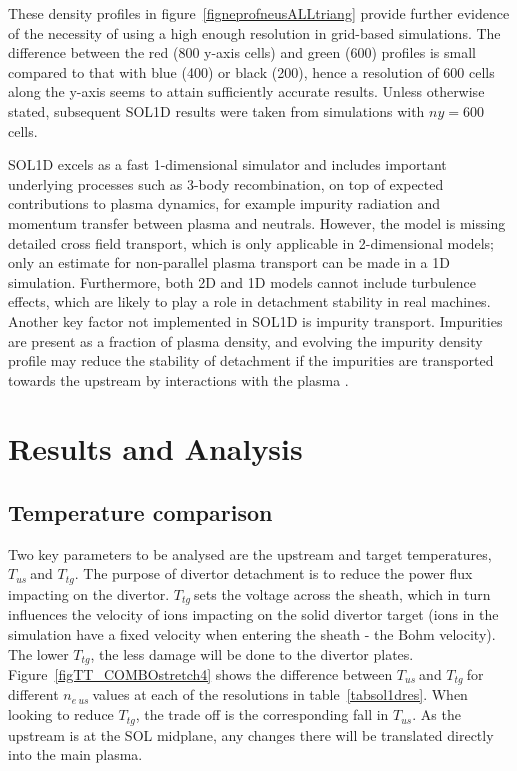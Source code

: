 \documentclass[12pt]{article}  %
\providecommand{\neus}{$n_{e~us}~$} %
\providecommand{\Tus}{$T_{us}~$} %
\providecommand{\Ttg}{$T_{tg}~$} %
\providecommand{\tus}{$T_{us}$} %
\providecommand{\ttg}{$T_{tg}$} %
\begin{document}
These density profiles in figure~\ref{figneprofneusALLtriang} provide further evidence of the necessity of using a high enough resolution in grid-based simulations. The difference between the red (800 y-axis cells) and green (600) profiles is small compared to that with blue (400) or black (200), hence a resolution of 600 cells along the y-axis seems to attain sufficiently accurate results. Unless otherwise stated, subsequent SOL1D results were taken from simulations with $ny = 600$ cells.

SOL1D excels as a fast 1-dimensional simulator and includes important underlying processes such as 3-body recombination, on top of expected contributions to plasma dynamics, for example impurity radiation and momentum transfer between plasma and neutrals. However, the model is missing detailed cross field transport, which is only applicable in 2-dimensional models; only an estimate for non-parallel plasma transport can be made in a 1D simulation. Furthermore, both 2D and 1D models cannot include turbulence effects, which are likely to play a role in detachment stability in real machines. Another key factor not implemented in SOL1D is impurity transport. Impurities are present as a fraction of plasma density, and evolving the impurity density profile may reduce the stability of detachment if the impurities are transported towards the upstream by interactions with the plasma \cite{Nakazawa2000}.



\section{Results and Analysis}\label{secResults}
\subsection{Temperature comparison}\label{ssectempcomp}
Two key parameters to be analysed are the upstream and target temperatures, \Tus and \ttg. The purpose of divertor detachment is to reduce the power flux impacting on the divertor. \Ttg sets the voltage across the sheath, which in turn influences the velocity of ions impacting on the solid divertor target (ions in the simulation have a fixed velocity when entering the sheath - the Bohm velocity). The lower \ttg, the less damage will be done to the divertor plates. Figure~\ref{figTT_COMBOstretch4} shows the difference between \Tus and \Ttg for different \neus values at each of the resolutions in table~\ref{tabsol1dres}. When looking to reduce \ttg, the trade off is the corresponding fall in \tus. As the upstream is at the SOL midplane, any changes there will be translated directly into the main plasma. 
\end{document}
